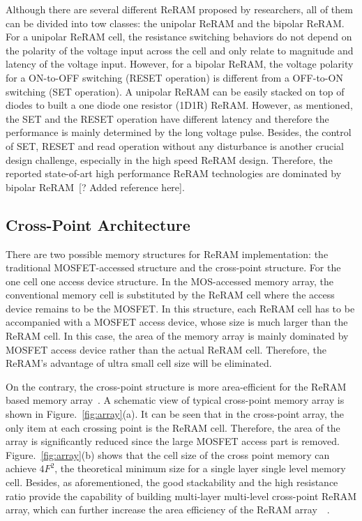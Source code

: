Although there are several different ReRAM proposed by researchers, all of them can be divided into tow classes: the unipolar ReRAM and the bipolar ReRAM. For a unipolar ReRAM cell, the resistance switching behaviors do not depend on the polarity of the voltage input across the cell and only relate to magnitude and latency of the voltage input. However, for a bipolar ReRAM, the voltage polarity for a ON-to-OFF switching (RESET operation) is different from a OFF-to-ON switching (SET operation). A unipolar ReRAM can be easily stacked on top of diodes to built a one diode one resistor (1D1R) ReRAM. However, as mentioned, the SET and the RESET operation have different latency and therefore the performance is mainly determined by the long voltage pulse. Besides, the control of SET, RESET and read operation without any disturbance is another crucial design challenge, especially in the high speed ReRAM design. Therefore, the reported state-of-art high performance ReRAM technologies are dominated by bipolar ReRAM~[? Added reference here].

\subsection{Cross-Point Architecture}
There are two possible memory structures for ReRAM implementation: the traditional MOSFET-accessed structure and the cross-point structure. For the one cell one access device structure. In the MOS-accessed memory array, the conventional memory cell is substituted by the ReRAM cell where the access device remains to be the MOSFET. In this structure, each ReRAM cell has to be accompanied with a MOSFET access device, whose size is much larger than the ReRAM cell. In this case, the area of the memory array is mainly dominated by MOSFET access device rather than the actual ReRAM cell. Therefore, the ReRAM's advantage of ultra small cell size will be eliminated.

On the contrary, the cross-point structure is more area-efficient for the ReRAM based memory array~\cite{memristor:Cong}. A schematic view of typical cross-point memory array is shown in Figure.~\ref{fig:array}(a). It can be seen that in the cross-point array, the only item at each crossing point is the ReRAM cell. Therefore, the area of the array is significantly reduced since the large MOSFET access part is removed. Figure.~\ref{fig:array}(b) shows that the cell size of the cross point memory can achieve $4F^2$, the theoretical minimum size for a single layer single level memory cell. Besides, as aforementioned, the good stackability and the high resistance ratio provide the capability of building multi-layer multi-level cross-point ReRAM array, which can further increase the area efficiency of the  ReRAM array~\cite{memristor:ISSCC2011_ITRI}~\cite{memristor:IEDM08_3D}.

